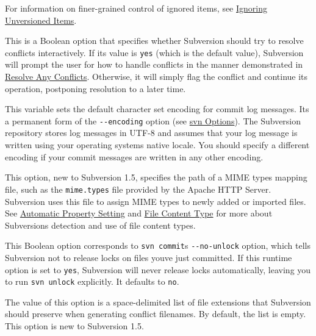 \begin{description}
For information on finer-grained control of ignored items, see
\hyperref[svn.advanced.props.special.ignore]{Ignoring Unversioned
Items}.
\item[\texttt{interactive-conflicts}]
This is a Boolean option that specifies whether Subversion should try to
resolve conflicts interactively. If its value is \texttt{yes} (which is
the default value), Subversion will prompt the user for how to handle
conflicts in the manner demonstrated in
\hyperref[svn.tour.cycle.resolve]{Resolve Any Conflicts}. Otherwise, it
will simply flag the conflict and continue its operation, postponing
resolution to a later time.
\item[\texttt{log-encoding}]
This variable sets the default character set encoding for commit log
messages. It\textquotesingle s a permanent form of the
\texttt{-\/-encoding} option (see \hyperref[svn.ref.svn.sw]{svn
Options}). The Subversion repository stores log messages in UTF-8 and
assumes that your log message is written using your operating
system\textquotesingle s native locale. You should specify a different
encoding if your commit messages are written in any other encoding.
\item[\texttt{mime-types-file}]
This option, new to Subversion 1.5, specifies the path of a MIME types
mapping file, such as the \texttt{mime.types} file provided by the
Apache HTTP Server. Subversion uses this file to assign MIME types to
newly added or imported files. See
\hyperref[svn.advanced.props.auto]{Automatic Property Setting} and
\hyperref[svn.advanced.props.special.mime-type]{File Content Type} for
more about Subversion\textquotesingle s detection and use of file
content types.
\item[\texttt{no-unlock}]
This Boolean option corresponds to
\texttt{svn\ commit}\textquotesingle s \texttt{-\/-no-unlock} option,
which tells Subversion not to release locks on files
you\textquotesingle ve just committed. If this runtime option is set to
\texttt{yes}, Subversion will never release locks automatically, leaving
you to run \texttt{svn\ unlock} explicitly. It defaults to \texttt{no}.
\item[\texttt{preserved-conflict-file-exts}]
The value of this option is a space-delimited list of file extensions
that Subversion should preserve when generating conflict filenames. By
default, the list is empty. This option is new to Subversion 1.5.


\end{description}
